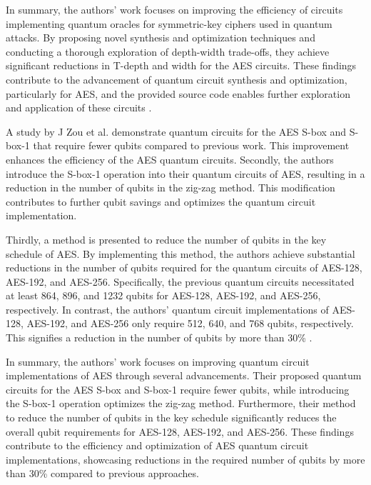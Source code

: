 In summary, the authors' work focuses on improving the efficiency of circuits implementing quantum oracles for symmetric-key ciphers used in quantum attacks. By proposing novel synthesis and optimization techniques and conducting a thorough exploration of depth-width trade-offs, they achieve significant reductions in T-depth and width for the AES circuits. These findings contribute to the advancement of quantum circuit synthesis and optimization, particularly for AES, and the provided source code enables further exploration and application of these circuits \cite{sharma2023post}\cite{dunne2023analysis}. 
 

A study by J Zou et al. demonstrate quantum circuits for the AES S-box and S-box-1 that require fewer qubits compared to previous work. This improvement enhances the efficiency of the AES quantum circuits. Secondly, the authors introduce the S-box-1 operation into their quantum circuits of AES, resulting in a reduction in the number of qubits in the zig-zag method. This modification contributes to further qubit savings and optimizes the quantum circuit implementation. 
 

Thirdly, a method is presented to reduce the number of qubits in the key schedule of AES. By implementing this method, the authors achieve substantial reductions in the number of qubits required for the quantum circuits of AES-128, AES-192, and AES-256. Specifically, the previous quantum circuits necessitated at least 864, 896, and 1232 qubits for AES-128, AES-192, and AES-256, respectively. In contrast, the authors' quantum circuit implementations of AES-128, AES-192, and AES-256 only require 512, 640, and 768 qubits, respectively. This signifies a reduction in the number of qubits by more than 30\% \cite{yan2016improved}. 


In summary, the authors' work focuses on improving quantum circuit implementations of AES through several advancements. Their proposed quantum circuits for the AES S-box and S-box-1 require fewer qubits, while introducing the S-box-1 operation optimizes the zig-zag method. Furthermore, their method to reduce the number of qubits in the key schedule significantly reduces the overall qubit requirements for AES-128, AES-192, and AES-256. These findings contribute to the efficiency and optimization of AES quantum circuit implementations, showcasing reductions in the required number of qubits by more than 30\% compared to previous approaches. 

